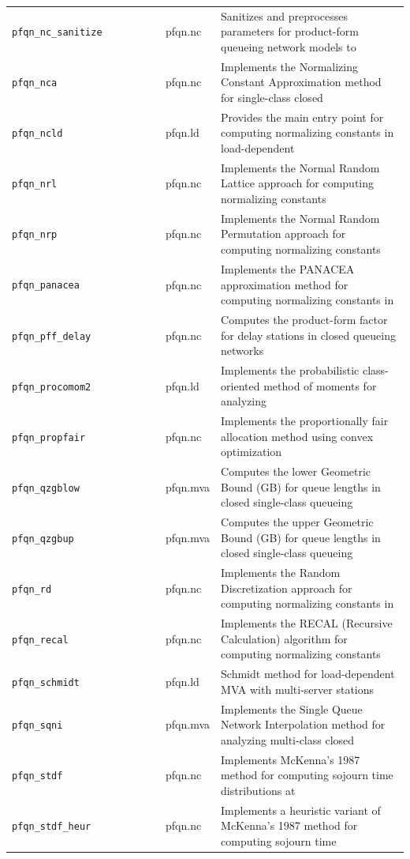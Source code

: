 \begin{footnotesize}
\begin{longtable}{|p{0.4\linewidth}|p{0.1\linewidth}|p{0.5\linewidth}|}
\texttt{pfqn\_nc\_sanitize} & pfqn.nc & Sanitizes and preprocesses parameters for product-form queueing network models to\\
\texttt{pfqn\_nca} & pfqn.nc & Implements the Normalizing Constant Approximation method for single-class closed\\
\texttt{pfqn\_ncld} & pfqn.ld & Provides the main entry point for computing normalizing constants in load-dependent\\
\texttt{pfqn\_nrl} & pfqn.nc & Implements the Normal Random Lattice approach for computing normalizing constants\\
\texttt{pfqn\_nrp} & pfqn.nc & Implements the Normal Random Permutation approach for computing normalizing constants\\
\texttt{pfqn\_panacea} & pfqn.nc & Implements the PANACEA approximation method for computing normalizing constants in\\
\texttt{pfqn\_pff\_delay} & pfqn.nc & Computes the product-form factor for delay stations in closed queueing networks\\
\texttt{pfqn\_procomom2} & pfqn.ld & Implements the probabilistic class-oriented method of moments for analyzing\\
\texttt{pfqn\_propfair} & pfqn.nc & Implements the proportionally fair allocation method using convex optimization\\
\texttt{pfqn\_qzgblow} & pfqn.mva & Computes the lower Geometric Bound (GB) for queue lengths in closed single-class queueing\\
\texttt{pfqn\_qzgbup} & pfqn.mva & Computes the upper Geometric Bound (GB) for queue lengths in closed single-class queueing\\
\texttt{pfqn\_rd} & pfqn.nc & Implements the Random Discretization approach for computing normalizing constants in\\
\texttt{pfqn\_recal} & pfqn.nc & Implements the RECAL (Recursive Calculation) algorithm for computing normalizing constants\\
\texttt{pfqn\_schmidt} & pfqn.ld & Schmidt method for load-dependent MVA with multi-server stations\\
\texttt{pfqn\_sqni} & pfqn.mva & Implements the Single Queue Network Interpolation method for analyzing multi-class closed\\
\texttt{pfqn\_stdf} & pfqn.nc & Implements McKenna's 1987 method for computing sojourn time distributions at\\
\texttt{pfqn\_stdf\_heur} & pfqn.nc & Implements a heuristic variant of McKenna's 1987 method for computing sojourn time\\

\end{longtable}
\end{footnotesize}
